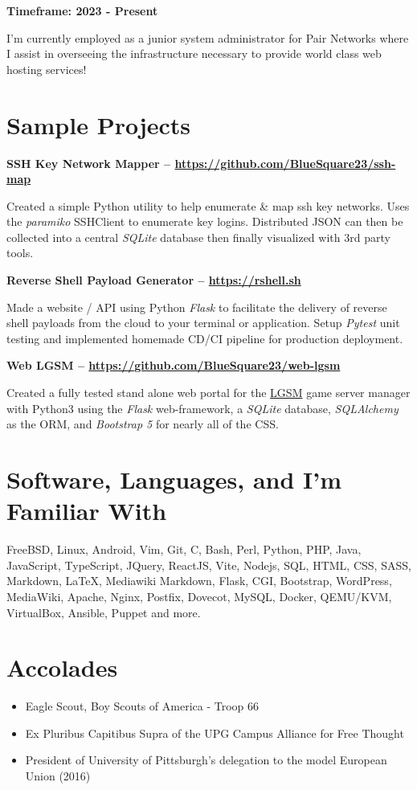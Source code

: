 \documentclass{article}
\begin{document}
\noindent
\textbf{Timeframe: 2023 - Present}

I'm currently employed as a junior system administrator for Pair Networks where
I assist in overseeing the infrastructure necessary to provide world class web
hosting services!

\section{Sample Projects}

\noindent
\textbf{SSH Key Network Mapper -- \url{https://github.com/BlueSquare23/ssh-map}}

Created a simple Python utility to help enumerate \& map ssh key networks. Uses
the \emph{paramiko} SSHClient to enumerate key logins. Distributed JSON can then
be collected into a central \emph{SQLite} database then finally visualized
with 3rd party tools.

\noindent
\textbf{Reverse Shell Payload Generator -- \url{https://rshell.sh}}

Made a website / API using Python \emph{Flask} to facilitate the delivery of
reverse shell payloads from the cloud to your terminal or application. Setup
\emph{Pytest} unit testing and implemented homemade CD/CI pipeline for
production deployment.

\noindent
\textbf{Web LGSM -- \url{https://github.com/BlueSquare23/web-lgsm}}

Created a fully tested stand alone web portal for the
\href{https://linuxgsm.com/}{LGSM} game server manager with Python3 using the
\emph{Flask} web-framework, a \emph{SQLite} database, \emph{SQLAlchemy} as the
ORM, and \emph{Bootstrap 5} for nearly all of the CSS.

\section{Software, Languages, and I'm Familiar With}

FreeBSD, Linux, Android, Vim, Git, C, Bash, Perl, Python, PHP, Java,
JavaScript, TypeScript, JQuery, ReactJS, Vite, Nodejs, SQL, HTML, CSS, SASS,
Markdown, {\LaTeX}, Mediawiki Markdown, Flask, CGI, Bootstrap, WordPress,
MediaWiki, Apache, Nginx, Postfix, Dovecot, MySQL, Docker, QEMU/KVM,
VirtualBox, Ansible, Puppet and more. 

\section{Accolades}

\begin{itemize}
\setlength{\itemsep}{1pt}
\setlength{\parskip}{0pt}
\setlength{\parsep}{0pt}

\item Eagle Scout, Boy Scouts of America - Troop 66

\item Ex Pluribus Capitibus Supra of the UPG Campus Alliance for Free Thought

\item President of University of Pittsburgh's delegation to the model European Union (2016)
\end{itemize}
\end{document}
